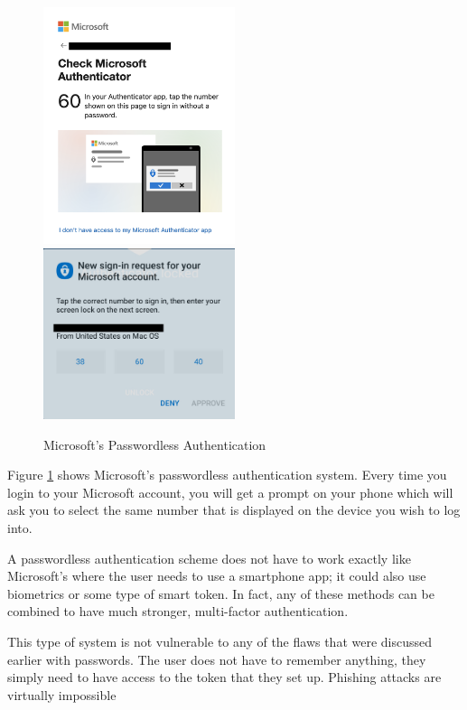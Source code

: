 \documentclass[12pt, letterpaper]{article}
\begin{document}
\begin{figure}[H]
\includegraphics[width=0.5\textwidth]{mslogin.png}
\includegraphics[width=0.5\textwidth]{authenticator.png}
\caption{Microsoft's Passwordless Authentication\label{msauth}}
\end{figure}

Figure \ref{msauth} shows Microsoft's passwordless authentication system.
Every time you login to your Microsoft account, you will get a prompt on your phone which will ask you to select the same number that is displayed on the device you wish to log into.

A passwordless authentication scheme does not have to work exactly like Microsoft's where the user needs to use a smartphone app; it could also use biometrics or some type of smart token.
In fact, any of these methods can be combined to have much stronger, multi-factor authentication.

This type of system is not vulnerable to any of the flaws that were discussed earlier with passwords.
The user does not have to remember anything, they simply need to have access to the token that they set up.
Phishing attacks are virtually impossible 
\end{document}
